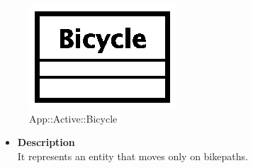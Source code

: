 \begin{figure}[h]
\centering
\includegraphics[scale=0.6,keepaspectratio]{images/solution/bicycle.eps}
\caption{App::Active::Bicycle}
\label{fig:sd-app-bicycle}
\end{figure}
\FloatBarrier
\begin{itemize}
  \item \textbf{Description} \\
It represents an entity that moves only on bikepaths.
\end{itemize} 
